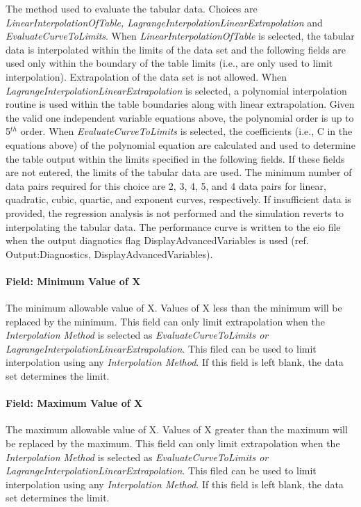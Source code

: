 The method used to evaluate the tabular data. Choices are \emph{LinearInterpolationOfTable, LagrangeInterpolationLinearExtrapolation} and \emph{EvaluateCurveToLimits}. When \emph{LinearInterpolationOfTable} is selected, the tabular data is interpolated within the limits of the data set and the following fields are used only within the boundary of the table limits (i.e., are only used to limit interpolation). Extrapolation of the data set is not allowed. When \emph{LagrangeInterpolationLinearExtrapolation} is selected, a polynomial interpolation routine is used within the table boundaries along with linear extrapolation. Given the valid one independent variable equations above, the polynomial order is up to 5\(^{th}\) order. When \emph{EvaluateCurveToLimits} is selected, the coefficients (i.e., C in the equations above) of the polynomial equation are calculated and used to determine the table output within the limits specified in the following fields. If these fields are not entered, the limits of the tabular data are used. The minimum number of data pairs required for this choice are 2, 3, 4, 5, and 4 data pairs for linear, quadratic, cubic, quartic, and exponent curves, respectively. If insufficient data is provided, the regression analysis is not performed and the simulation reverts to interpolating the tabular data. The performance curve is written to the eio file when the output diagnotics flag DisplayAdvancedVariables is used (ref. Output:Diagnostics, DisplayAdvancedVariables).

\paragraph{Field: Minimum Value of X}\label{field-minimum-value-of-x-000}

The minimum allowable value of X. Values of X less than the minimum will be replaced by the minimum. This field can only limit extrapolation when the \emph{Interpolation Method} is selected as \emph{EvaluateCurveToLimits or LagrangeInterpolationLinearExtrapolation}. This filed can be used to limit interpolation using any \emph{Interpolation Method}. If this field is left blank, the data set determines the limit.

\paragraph{Field: Maximum Value of X}\label{field-maximum-value-of-x-000}

The maximum allowable value of X. Values of X greater than the maximum will be replaced by the maximum. This field can only limit extrapolation when the \emph{Interpolation Method} is selected as \emph{EvaluateCurveToLimits or LagrangeInterpolationLinearExtrapolation}. This filed can be used to limit interpolation using any \emph{Interpolation Method}. If this field is left blank, the data set determines the limit.

